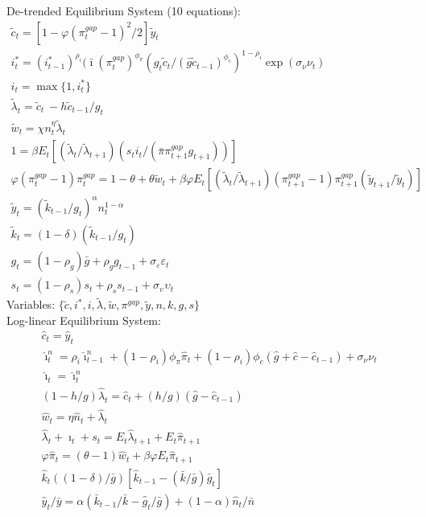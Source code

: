 \documentclass[12pt, final]{article}
\begin{document}
\setcounter{equation}{0}
\noindent De-trended Equilibrium System (10 equations):
\small\begin{gather}
\tilde{c}_t = [1-\varphi(\pi_t^{gap} - 1)^2/2]\tilde{y}_t\\
i_t^*=(i^*_{t-1})^{\rho_i}(\bar{\imath}(\pi_t^{gap})^{\phi_\pi}(g_t\tilde{c}_t/(\bar{g}\tilde{c}_{t-1})^{\phi_c})^{1-\rho_i}\exp(\sigma_\nu\nu_t)\\
i_t=\max\{1,i_t^*\}\\
\tilde{\lambda}_t = \tilde{c}_t\ - h\tilde{c}_{t-1}/g_t\\
\tilde{w}_t = \chi n_t^\eta \tilde{\lambda}_t  \\
  1 = \beta E_t[(\tilde{\lambda}_t/\tilde{\lambda}_{t+1})(s_ti_t/(\bar{\pi}\pi_{t+1}^{gap}g_{t+1}))]\\
  \varphi(\pi_t^{gap}-1){\pi}_t^{gap} = 1-\theta + \theta\tilde{w}_t + \beta\varphi E_t[(\tilde{\lambda}_t/\tilde{\lambda}_{t+1}) (\pi_{t+1}^{gap}-1)\pi_{t+1}^{gap}(\tilde{y}_{t+1}/\tilde{y}_t)]\\
  \tilde{y}_t= (\tilde{k}_{t-1}/g_t)^\alpha n_t^{1-\alpha}\\ %
\tilde{k}_t = (1-\delta)(\tilde{k}_{t-1}/g_t)\\%
  g_t= (1-\rho_g)\bar{g}+\rho_gg_{t-1} + \sigma_\varepsilon\varepsilon_t \\
  s_t=(1-\rho_s)s_t+\rho_ss_{t-1} + \sigma_\upsilon\upsilon_t
\end{gather}
Variables: $\{\tilde{c},i^*,i,\tilde{\lambda},\tilde{w},\pi^{gap},\tilde{y},n,k,g,s\}$\\ 

\setcounter{equation}{0}
\noindent Log-linear Equilibrium System:
\begin{gather}
  \hat{c}_t = \hat{y}_t\\
  \hat{\imath}_t^n = \rho_i\hat{\imath}^n_{t-1} + (1-\rho_i)\phi_\pi\hat{\pi}_t+ (1-\rho_i)\phi_c(\hat{g}+\hat{c}-\hat{c}_{t-1})+\sigma_\nu\nu_t \\
  \hat{\imath}_t = \hat{\imath}_t^n\\
  (1-h/g)\hat{\lambda}_t = \hat{c}_t + (h/g)(\hat{g} - \hat{c}_{t-1})\\
  \hat{w}_t =  \eta\hat{n}_t + \hat{\lambda}_t\\
  \hat{\lambda}_t + \hat{\imath}_t + s_t  = E_t\hat{\lambda}_{t+1}+E_t\hat{\pi}_{t+1} \\
  \varphi\hat{\pi}_t = (\theta-1)\hat{w}_t+\beta\varphi E_t\hat{\pi}_{t+1}\\
\hat{k}_t ((1-\delta)/\bar{g})[\hat{k}_{t-1} - (\bar{k}/\bar{g})\bar{g}_t]\\%
  \hat{y}_t/\bar{y} = \alpha(\bar{k}_{t-1}/\bar{k}-\hat{g}_t/\bar{g}) + (1-\alpha)\hat{n}_t/\bar{n} %
\end{gather}
\end{document}
